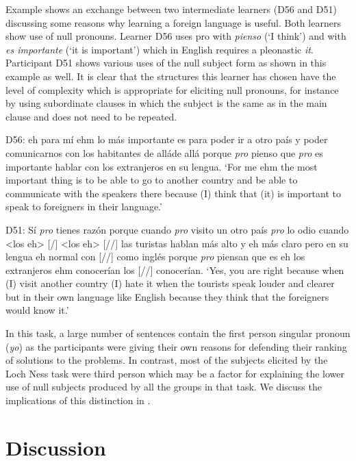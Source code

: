 \documentclass[output=paper]{langscibook}
\begin{document}
Example  shows an exchange between two intermediate learners (D56 and D51) discussing some reasons why learning a foreign language is useful. Both learners show use of null pronouns. Learner D56 uses pro with \textit{pienso} (`I think') and with \textit{es importante} (`it is important') which in English requires a pleonastic \textit{it}. Participant D51 shows various uses of the null subject form as shown in this example as well. It is clear that the structures this learner has chosen have the level of complexity which is appropriate for eliciting null pronouns, for instance by using subordinate clauses in which the subject is the same as in the main clause and does not need to be repeated.

\ea%
    \label{ex:dominguez:18}
           D56: eh para mí\- ehm lo más importante es para poder ir a otro país y poder comunicarnos con los habitantes de allá\- [/] de allá\- porque \textit{pro} pienso que \textit{pro} es importante hablar con los extranjeros en su lengua.
\glt ‘For me ehm the most important thing is to be able to go to another country and be able to communicate with the speakers there because (I) think that (it) is important to speak to foreigners in their language.’

\medskip
D51: Sí\- \textit{pro} tienes razón porque cuando \textit{pro} visito un otro país \textit{pro} lo odio cuando <los eh> [/] <los eh> [//] las turistas hablan más alto y eh más claro pero en su lengua eh normal con [//] como inglés porque \textit{pro} piensan que es eh los extranjeros ehm conocerían los [//] conocerían.
\glt ‘Yes, you are right because when (I) visit another country (I) hate it when the tourists speak louder and clearer but in their own language like English because they think that the foreigners would know it.’
\z

In this task, a large number of sentences contain the first person singular pronoun (\textit{yo}) as the participants were giving their own reasons for defending their ranking of solutions to the problems. In contrast, most of the subjects elicited by the Loch Ness task were third person which may be a factor for explaining the lower use of null subjects produced by all the groups in that task. We discuss the implications of this distinction in .

\section{Discussion}\label{sec:dominguez:discussion}
\end{document}
